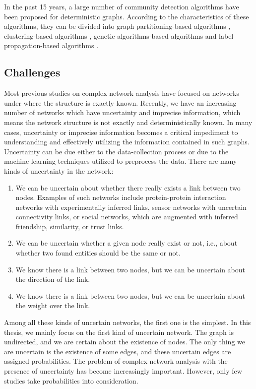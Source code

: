 \documentclass[\main/thesis.tex]{subfiles}
\begin{document}
In the past 15 years, a large number of community detection algorithms have been proposed for deterministic graphs. According to the characteristics of these algorithms, they can be divided into graph partitioning-based algorithms \cite{kernighan1970efficient,newman2013community}, clustering-based algorithms \cite{girvan2002community,newman2004fast,blondel2008fast,clauset2004finding}, genetic algorithms-based algorithms \cite{pizzuti2008ga} and label propagation-based algorithms \cite{raghavan2007near}.

\subsection{Challenges} \label{challenges}
Most previous studies on complex network analysis have focused on networks under where the structure is exactly known. Recently, we have an increasing number of networks which have uncertainty and imprecise information, which means the network structure is not exactly and deterministically known. In many cases, uncertainty or imprecise information becomes a critical impediment to understanding and effectively utilizing the information contained in such graphs. Uncertainty can be due either to the data-collection process or due to the machine-learning techniques utilized to preprocess the data. There are many kinds of uncertainty in the network:

\begin{enumerate}
\item We can be uncertain about whether there really exists a link between two nodes. Examples of such networks  include  protein-protein  interaction  networks  with experimentally inferred links, sensor networks with  uncertain  connectivity  links,  or  social  networks, which are augmented with inferred friendship, similarity, or trust links. 
\item We can be uncertain whether a given node really exist or not, i.e., about whether two found entities should be the same or not.
\item We know there is a link between two nodes, but we can be uncertain about the direction of the link.
\item We know there is a link between two nodes, but we can be uncertain about the weight over the link.
\end{enumerate}

Among all these kinds of uncertain networks, the first one is the simplest. In this thesis, we mainly focus on the first kind of uncertain network. The graph is undirected, and we are certain about the existence of nodes. The only thing we are uncertain is the existence of some edges, and these uncertain edges are assigned probabilities. The problem of complex network analysis with the presence of uncertainty has become increasingly important. However, only few studies take probabilities into consideration.
\end{document}
